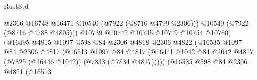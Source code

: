 \begin{lexlean}{RustStd}
\begin{coremodule}
                                                      @2366
                                                      @16748
                                                      @16471
                                                      @10540
                                                      (@7922 (@8716 @4799 @2306)))
                                                    @10540
                                                    (@7922 (@8716 @4788 @4805)))
                                                  @10739
                                                  @10742
                                                  @10745
                                                  @10749
                                                  @10754
                                                  @10760)
                                                (@16495
                                                  @4815
                                                  @1097
                                                  @598
                                                  @84
                                                  @2306
                                                  @4818
                                                  @2306
                                                  @4822
                                                  (@16535
                                                    @1097
                                                    @84
                                                    @2306
                                                    @4817
                                                    (@16513
                                                      @1097
                                                      @84
                                                      @4817
                                                      (@16441
                                                        @1042
                                                        @84
                                                        @1042
                                                        @4817
                                                        (@7825 (@16446 @1042))
                                                        (@7833 (@7834 @4817)))))
                                                  (@16535
                                                    @598
                                                    @84
                                                    @2306
                                                    @4821
                                                    (@16513

\end{coremodule}
\end{lexlean}
